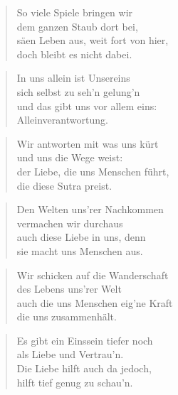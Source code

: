 \documentclass[10pt,a4paper]{article}
\begin{document}
\begin{multicols}{2}
\begin{verse}
So viele Spiele bringen wir \\
dem ganzen Staub dort bei, \\
säen Leben aus, weit fort von hier, \\
doch bleibt es nicht dabei. \\
\end{verse}

\begin{verse}
In uns allein ist Unsereins \\
sich selbst zu seh’n gelung’n \\
und das gibt uns vor allem eins: \\
Alleinverantwortung. \\
\end{verse}

\begin{verse}
Wir antworten mit was uns kürt \\
und uns die Wege weist: \\
der Liebe, die uns Menschen führt, \\
die diese Sutra preist. \\
\end{verse}

\begin{verse}
Den Welten uns’rer Nachkommen \\
vermachen wir durchaus \\
auch diese Liebe in uns, denn \\
sie macht uns Menschen aus. \\
\end{verse}

\begin{verse}
Wir schicken auf die Wanderschaft \\
des Lebens uns’rer Welt \\
auch die uns Menschen eig’ne Kraft \\
die uns zusammenhält. \\
\end{verse}

\begin{verse}
Es gibt ein Einssein tiefer noch \\
als Liebe und Vertrau’n. \\
Die Liebe hilft auch da jedoch, \\
hilft tief genug zu schau’n. \\
\end{verse}


\end{multicols}
\end{document}
